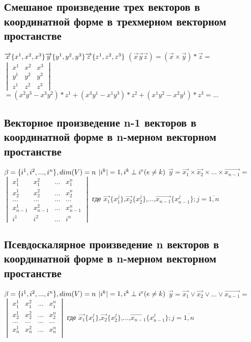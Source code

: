\documentclass{article}
\begin{document}
\subsection{Смешаное произведение трех векторов в координатной форме в трехмерном векторном простанстве}
$\overrightarrow{x}\{x^1,x^2,x^3\}  \overrightarrow{y}\{y^1,y^2,y^3\}  \overrightarrow{z}\{z^1,z^2,z^3\}\\$
$(\overrightarrow{x}\overrightarrow{y}\overrightarrow{z})=(\overrightarrow{x}\times\overrightarrow{y})*\overrightarrow{z}=$
$\begin{vmatrix}
    x^1 & x^2 & x^3\\
    y^1 & y^2 & y^3\\
    z^1 & z^2 & z^3
\end{vmatrix}$
$=(x^2y^3-x^3y^2)*z^1+(x^3y^1-x^1y^3)*z^2+(x^1y^2-x^2y^1)*z^3=...$
\subsection{Векторное произведение n-1 векторов в координатной форме в n-мерном векторном простанстве}
$\beta=\{i^1,i^2,...,i^n\}, dim(V)=n\\$
$|i^k|=1, i^k \perp i^e (e \neq k)\\$
$\overrightarrow{y}=\overrightarrow{x_1}\times\overrightarrow{x_2}\times...\times\overrightarrow{x_{n-1}}=$
$\begin{vmatrix}
    x_1^1 & x_1^2 & ... & x_1^n\\
    x_2^1 & x_2^2 & ... & x_2^n\\
    ... & ... & ... & ...\\
    x_{n-1}^1 & x_{n-1}^2 & ... & x_{n-1}^n\\
    i^1 & i^2 & ... & i^n
\end{vmatrix}$ где $\overrightarrow{x_1}\{x^j_1\}$,$\overrightarrow{x_2}\{x^j_2\}$,...,$\overrightarrow{x_{n-1}}\{x^j_{n-1}\}; j=\overline{1,n}$

\subsection{Псевдоскалярное произведение n векторов в координатной форме в n-мерном векторном простанстве}
$\beta=\{i^1,i^2,...,i^n\}, dim(V)=n\\$
$|i^k|=1, i^k \perp i^e (e \neq k)\\$
$\overrightarrow{y}=\overrightarrow{x_1}\vee\overrightarrow{x_2}\vee...\vee\overrightarrow{x_{n-1}}=$
$\begin{vmatrix}
    x_1^1 & x_1^2 & ... & x_1^n\\
    x_2^1 & x_2^2 & ... & x_2^n\\
    ... & ... & ... & ...\\
    x_{n}^1 & x_{n}^2 & ... & x_{n}^n\\
\end{vmatrix}$ где $\overrightarrow{x_1}\{x^j_1\}$,$\overrightarrow{x_2}\{x^j_2\}$,...,$\overrightarrow{x_{n-1}}\{x^j_{n-1}\}; j=\overline{1,n}$
\newpage
\end{document}
